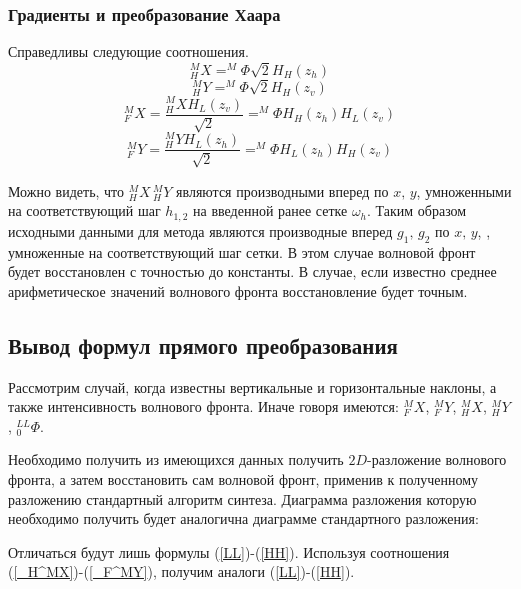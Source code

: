\documentclass{article}
\begin{document}
\subsubsection{Градиенты и преобразование Хаара}
Справедливы следующие соотношения.
\begin{equation}\label{_H^MX}
_H^MX = ^M\Phi\sqrt{2}H_H(z_h) 
\end{equation}
\begin{equation}\label{_H^MY}
_H^MY = ^M\Phi\sqrt{2}H_H(z_v)
\end{equation}
\begin{equation}\label{_F^MX}
_F^MX = \frac{_H^MX H_L(z_v)}{\sqrt{2}}=^M\Phi H_H(z_h) H_L(z_v)
\end{equation}
\begin{equation}\label{_F^MY}
_F^MY = \frac{_H^MY H_L(z_h)}{\sqrt{2}}=^M\Phi H_L(z_h) H_H(z_v)
\end{equation}

Можно видеть, что $_H^MX \, _H^MY$ являются производными вперед по $x, \, y$, умноженными на соответствующий шаг $h_{1,2}$ на введенной ранее сетке $\omega_h$. Таким образом исходными данными для метода являются производные вперед $g_1,\,g_2$ по $x,\,y$, , умноженные на соответствующий шаг сетки. В этом случае волновой фронт будет восстановлен с точностью до константы. В случае, если известно среднее арифметическое значений волнового фронта восстановление будет точным.
\subsection{Вывод формул прямого преобразования}
Рассмотрим случай, когда известны вертикальные и горизонтальные наклоны, а также интенсивность волнового фронта. Иначе говоря имеются: $_F^MX$, $_F^MY$, $_H^MX$, $_H^MY$ , $_0^{LL}\Phi$.

Необходимо получить из имеющихся данных получить $2D$-разложение волнового фронта, а затем восстановить сам волновой фронт, применив к полученному разложению стандартный алгоритм синтеза.\cite{new_method1}
Диаграмма разложения которую необходимо получить будет аналогична диаграмме стандартного разложения:
\begin{center}
\end{center}
Отличаться будут лишь формулы (\ref{LL})-(\ref{HH}). Используя соотношения (\ref{_H^MX})-(\ref{_F^MY}), получим аналоги (\ref{LL})-(\ref{HH}).
\end{document}
